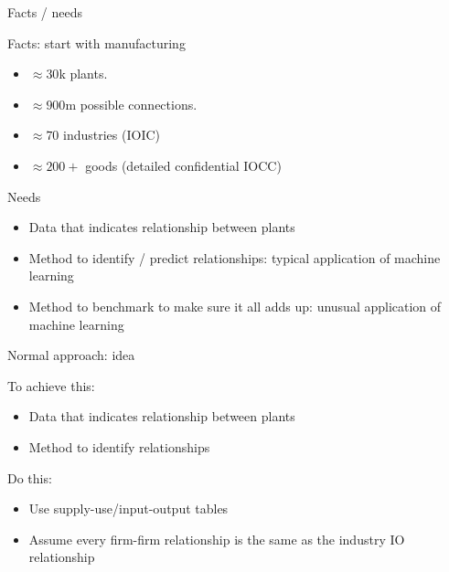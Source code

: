 \documentclass[12pt]{beamer}
\begin{document}
\begin{frame}{Facts / needs}
\begin{block}{Facts: start with manufacturing}
\begin{itemize}
\item $\approx 30$k plants. 
\item $\approx 900$m possible connections.
\item $\approx 70$ industries (IOIC)
\item $\approx 200+$ goods (detailed confidential IOCC)
\end{itemize}
\end{block}

\begin{block}{Needs}
\begin{itemize}
\item Data that indicates relationship between plants
\item Method to identify / predict relationships: typical application of machine learning
\item Method to benchmark to make sure it all adds up: unusual application of machine learning
\end{itemize}
\end{block}

\end{frame}



\begin{frame}{Normal approach: idea}

\begin{block}{To achieve this:}
\begin{itemize}
\item Data that indicates relationship between plants
\item Method to identify relationships
\end{itemize}
\end{block}

\begin{block}{Do this:}
\begin{itemize}
\item Use supply-use/input-output tables
\item Assume every firm-firm relationship is the same as the industry IO relationship
\end{itemize}
\end{block}

\end{frame}
\end{document}
